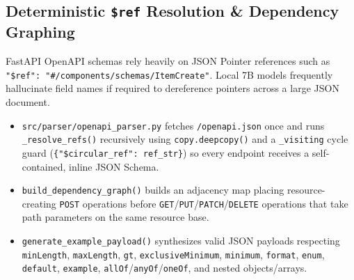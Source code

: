 \documentclass[11pt,a4paper]{article}
\begin{document}
\subsection{Deterministic \texttt{\$ref} Resolution \& Dependency Graphing}
FastAPI OpenAPI schemas rely heavily on JSON Pointer references such as \texttt{"\$ref": "\#/components/schemas/ItemCreate"}. Local 7B models frequently hallucinate field names if required to dereference pointers across a large JSON document.
\begin{itemize}[leftmargin=1.5em]
    \item \texttt{src/parser/openapi\_parser.py} fetches \texttt{/openapi.json} once and runs \texttt{\_resolve\_refs()} recursively using \texttt{copy.deepcopy()} and a \texttt{\_visiting} cycle guard (\texttt{\{"\$circular\_ref": ref\_str\}}) so every endpoint receives a self-contained, inline JSON Schema.
    \item \texttt{build\_dependency\_graph()} builds an adjacency map placing resource-creating \texttt{POST} operations before \texttt{GET}/\texttt{PUT}/\texttt{PATCH}/\texttt{DELETE} operations that take path parameters on the same resource base.
    \item \texttt{generate\_example\_payload()} synthesizes valid JSON payloads respecting \texttt{minLength}, \texttt{maxLength}, \texttt{gt}, \texttt{exclusiveMinimum}, \texttt{minimum}, \texttt{format}, \texttt{enum}, \texttt{default}, \texttt{example}, \texttt{allOf}/\texttt{anyOf}/\texttt{oneOf}, and nested objects/arrays.
\end{itemize}
\end{document}
